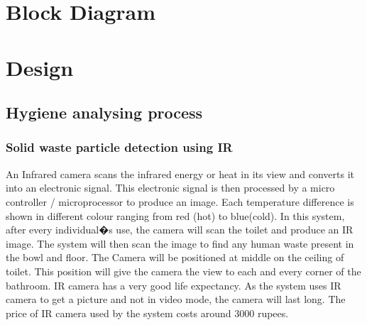 \documentclass[conference]{IEEEtran}
\begin{document}
\section{Block Diagram}
    
\section{Design}

    \subsection{Hygiene analysing process}
        \subsubsection{Solid waste particle detection using IR}
            An Infrared camera scans the infrared energy or heat in its view and converts it into an electronic signal. This electronic signal is then processed by a micro controller / microprocessor to produce an image. Each temperature difference is shown in different colour ranging from red (hot) to blue(cold).
            In this system, after every individual�s use, the camera will scan the toilet and produce an IR image. The system will then scan the image to find any human waste present in the bowl and floor. The Camera will be positioned at middle on the ceiling of toilet. This position will give the camera the view to each and every corner of the bathroom.
            IR camera has a very good life expectancy. As the system uses IR camera to get a picture and not in video mode, the camera will last long. The price of IR camera used by the system costs around 3000 rupees.
\end{document}
